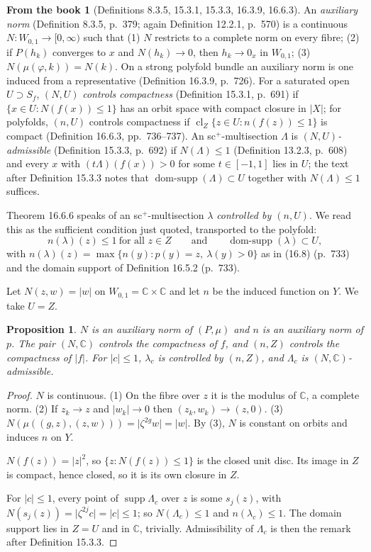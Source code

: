 \documentclass[11pt,a4paper]{article}
\theoremstyle{plain}
\newtheorem{proposition}[theorem]{Proposition}
\theoremstyle{definition}
\newtheorem{recall}[theorem]{From the book}
\theoremstyle{remark}
\newcommand{\C}{\mathbb{C}}
\newcommand{\abs}[1]{\lvert #1\rvert}
\newcommand{\supp}{\operatorname{supp}}
\newcommand{\domsupp}{\operatorname{dom-supp}}
\newcommand{\cl}{\operatorname{cl}}
\begin{document}
\begin{recall}[Definitions 8.3.5, 15.3.1, 15.3.3, 16.3.9, 16.6.3]\label{rec:norm}
An \emph{auxiliary norm} (Definition 8.3.5, p.~379; again Definition 12.2.1, p.~570) is a continuous
$N\colon W_{0,1}\to[0,\infty)$ such that (1) $N$ restricts to a complete norm on every fibre; (2) if
$P(h_k)$ converges to $x$ and $N(h_k)\to0$, then $h_k\to0_x$ in $W_{0,1}$; (3) $N(\mu(\varphi,k))=N(k)$.
On a strong polyfold bundle an auxiliary norm is one induced from a representative
(Definition 16.3.9, p.~726). For a saturated open $U\supset S_f$, $(N,U)$ \emph{controls compactness}
(Definition 15.3.1, p.~691) if $\{x\in U: N(f(x))\le1\}$ has an orbit space with compact closure in
$\abs X$; for polyfolds, $(n,U)$ controls compactness if $\cl_Z\{z\in U: n(f(z))\le1\}$ is compact
(Definition 16.6.3, pp.~736--737). An sc$^+$-multisection $\Lambda$ is \emph{$(N,U)$-admissible}
(Definition 15.3.3, p.~692) if $N(\Lambda)\le1$ (Definition 13.2.3, p.~608) and every $x$ with
$(t\Lambda)(f(x))>0$ for some $t\in[-1,1]$ lies in $U$; the text after Definition 15.3.3 notes that
$\domsupp(\Lambda)\subset U$ together with $N(\Lambda)\le1$ suffices.
\end{recall}

Theorem 16.6.6 speaks of an sc$^+$-multisection $\lambda$ \emph{controlled by $(n,U)$}. We read this as
the sufficient condition just quoted, transported to the polyfold:
\[
  n(\lambda)(z)\le1\ \text{for all } z\in Z\qquad\text{and}\qquad \domsupp(\lambda)\subset U,
\]
with $n(\lambda)(z)=\max\{n(y):p(y)=z,\ \lambda(y)>0\}$ as in (16.8) (p.~733) and the domain support of
Definition 16.5.2 (p.~733).

Let $N(z,w)=\abs w$ on $W_{0,1}=\C\times\C$ and let $n$ be the induced function on $Y$. We take $U=Z$.

\begin{proposition}\label{prop:norm}
$N$ is an auxiliary norm of $(P,\mu)$ and $n$ is an auxiliary norm of $p$. The pair $(N,\C)$ controls the
compactness of $f$, and $(n,Z)$ controls the compactness of $\abs f$. For $\abs c\le1$, $\lambda_c$ is
controlled by $(n,Z)$, and $\Lambda_c$ is $(N,\C)$-admissible.
\end{proposition}

\begin{proof}
$N$ is continuous. (1) On the fibre over $z$ it is the modulus of $\C$, a complete norm. (2) If
$z_k\to z$ and $\abs{w_k}\to0$ then $(z_k,w_k)\to(z,0)$. (3)
$N(\mu((g,z),(z,w)))=\abs{\zeta^{2g}w}=\abs w$. By (3), $N$ is constant on orbits and induces $n$ on
$Y$.

$N(f(z))=\abs{z}^2$, so $\{z: N(f(z))\le1\}$ is the closed unit disc. Its image in $Z$ is compact, hence
closed, so it is its own closure in $Z$.

For $\abs c\le1$, every point of $\supp\Lambda_c$ over $z$ is some $s_j(z)$, with
$N(s_j(z))=\abs{\zeta^{2j}c}=\abs c\le1$; so $N(\Lambda_c)\le1$ and $n(\lambda_c)\le1$. The domain
support lies in $Z=U$ and in $\C$, trivially. Admissibility of $\Lambda_c$ is then the remark after
Definition 15.3.3.
\end{proof}
\end{document}
